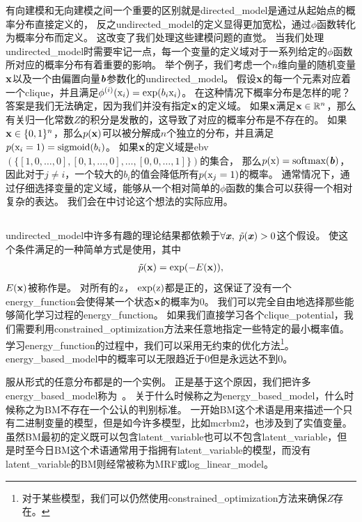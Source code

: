 有向建模和无向建模之间一个重要的区别就是\gls{directed_model}是通过从起始点的概率分布直接定义的，
反之\gls{undirected_model}的定义显得更加宽松，通过$\phi$函数转化为概率分布而定义。
这改变了我们处理这些建模问题的直觉。
当我们处理\gls{undirected_model}时需要牢记一点，每一个变量的定义域对于一系列给定的$\phi$函数所对应的概率分布有着重要的影响。
举个例子，我们考虑一个$n$维向量的随机变量$\mathbf{x}$以及一个由偏置向量$\boldsymbol{\mathit{b}}$参数化的\gls{undirected_model}。
假设$\mathbf{x}$的每一个元素对应着一个\gls{clique}，并且满足$\phi^{(i)}(\mathrm{x}_i) = \exp(b_i\mathrm{x}_i)$。
在这种情况下概率分布是怎样的呢？
答案是我们无法确定，因为我们并没有指定$\mathbf{x}$的定义域。
如果$\mathbf{x}$满足$\mathbf{x} \in \mathbb{R}^n$，那么有关归一化常数$Z$的积分是发散的，这导致了对应的概率分布是不存在的。
如果$\mathbf{x}\in\{0,1\}^n$，那么$p(\mathbf{x})$可以被分解成$n$个独立的分布，并且满足$p(\mathrm{x}_i=1) = \text{sigmoid}(b_i)$。
如果$\mathbf{x}$的定义域是\gls{ebv} $(\{[1,0,\ldots,0],[0,1,\ldots,0],\ldots,[0,0,\ldots,1]\})$的集合，
那么$p(\mathrm{x}) = \text{softmax}(\boldsymbol{\mathit{b}})$，因此对于$j\neq i$，一个较大的$b_i$的值会降低所有$p(\mathrm{x}_j = 1)$的概率。
通常情况下，通过仔细选择变量的定义域，能够从一个相对简单的$\phi$函数的集合可以获得一个相对复杂的表达。
我们会在中讨论这个想法的实际应用。


\subsection{}
\label{sec:energy_based_models}


\gls{undirected_model}中许多有趣的理论结果都依赖于$\forall \boldsymbol{\mathit{x}},\ \tilde{p}(\boldsymbol{\mathit{x}})>0$这个假设。
使这个条件满足的一种简单方式是使用，其中
\begin{align}
\label{eqn:167}
\tilde{p}(\mathbf{x}) = \exp(-E(\mathbf{x})),
\end{align}
$E(\mathbf{x})$被称作是。
对所有的$\mathrm{z}$， $\exp(\mathrm{z})$都是正的，这保证了没有一个\gls{energy_function}会使得某一个状态$\mathbf{x}$的概率为$0$。
我们可以完全自由地选择那些能够简化学习过程的\gls{energy_function}。
如果我们直接学习各个\gls{clique_potential}，我们需要利用\gls{constrained_optimization}方法来任意地指定一些特定的最小概率值。
学习\gls{energy_function}的过程中，我们可以采用无约束的优化方法\footnote{对于某些模型，我们可以仍然使用\gls{constrained_optimization}方法来确保$Z$存在。}。
\gls{energy_based_model}中的概率可以无限趋近于$0$但是永远达不到$0$。


服从形式的任意分布都是的一个实例。
正是基于这个原因，我们把许多\gls{energy_based_model}称为~\citep{Fahlman83,Ackley85,Hinton84,Hinton86a}。
关于什么时候称之为\gls{energy_based_model}，什么时候称之为\gls{BM}不存在一个公认的判别标准。
一开始\gls{BM}这个术语是用来描述一个只有二进制变量的模型，但是如今许多模型，比如\gls{mcrbm2}，也涉及到了实值变量。
虽然\gls{BM}最初的定义既可以包含\gls{latent_variable}也可以不包含\gls{latent_variable}，但是时至今日\gls{BM}这个术语通常用于指拥有\gls{latent_variable}的模型，而没有\gls{latent_variable}的\gls{BM}则经常被称为\gls{MRF}或\gls{log_linear_model}。



